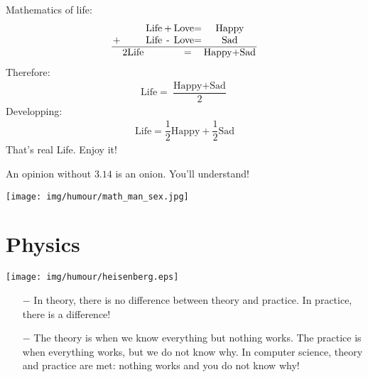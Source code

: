 	\begin{center}\underline{\hspace{5 cm}}\end{center}
	Mathematics of life:
	\begin{gather}
		\setlength{\tabcolsep}{1pt}
		\begin{tabular}{cccccc}
		& & \text{Life} & + & \text{Love}= & \text{Happy} \\
		$+$& & \text{Life} & - & \text{Love}= & \text{Sad} \\ \hline
		&2\text{Life}& & & = & \text{Happy}+\text{Sad} \\
		\end{tabular}
	\end{gather}
	Therefore:
	\begin{gather}
		\text{Life}=\dfrac{\text{Happy}+\text{Sad}}{2}
	\end{gather}
	Developping:
	\begin{gather}
		\text{Life}=\dfrac{1}{2}\text{Happy}+\dfrac{1}{2}\text{Sad}
	\end{gather}
	That's real Life. Enjoy it!
	
	\begin{center}\underline{\hspace{5 cm}}\end{center}
	An opinion without $3.14$ is an onion. You'll understand!
	
	\begin{center}\underline{\hspace{5 cm}}\end{center}

	\begin{center}
		\texttt{[image: img/humour/math\_man\_sex.jpg]}	
	\end{center}

	\pagebreak
	\section{Physics}
	
	\begin{center}
	\texttt{[image: img/humour/heisenberg.eps]}
	\end{center}
	
	\begin{center}\underline{\hspace{5 cm}}\end{center}	
	
	\begin{itemize}	 
		\item[$-$] In theory, there is no difference between theory and practice. In practice, there is a difference!
	
		\item[$-$] The theory is when we know everything but nothing works. The practice is when everything works, but we do not know why. In computer science, theory and practice are met: nothing works and you do not know why!
	\end{itemize}

